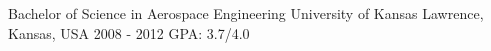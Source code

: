 \begin{cventries}
  \cveduentry
    {Bachelor of Science in Aerospace Engineering} %
    {}
    {University of Kansas} %
    {Lawrence, Kansas, USA} %
    {2008 - 2012} %
    {GPA: 3.7/4.0}
\end{cventries}
